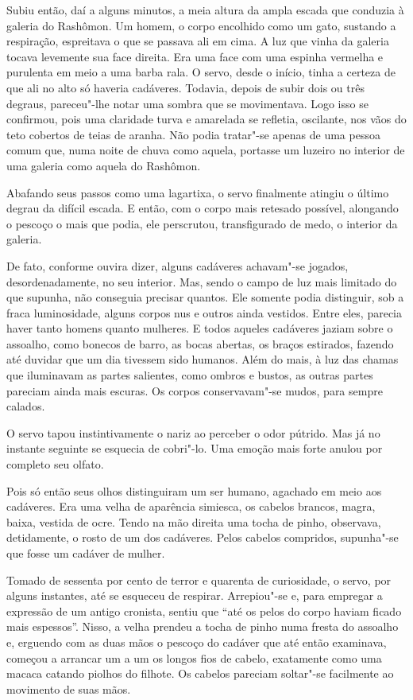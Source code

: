 Subiu então, daí a alguns minutos, a meia altura da ampla escada que
conduzia à galeria do Rashômon. Um homem, o corpo encolhido como um
gato, sustando a respiração, espreitava o que se passava ali em cima. A
luz que vinha da galeria tocava levemente sua face direita. Era uma
face com uma espinha vermelha e purulenta em meio a uma barba rala. O
servo, desde o início, tinha a certeza de que ali no alto só haveria
cadáveres. Todavia, depois de subir dois ou três degraus, pareceu"-lhe
notar uma sombra que se movimentava. Logo isso se confirmou, pois uma
claridade turva e amarelada se refletia, oscilante, nos vãos do teto
cobertos de teias de aranha. Não podia tratar"-se apenas de uma pessoa
comum que, numa noite de chuva como aquela, portasse um luzeiro no
interior de uma galeria como aquela do Rashômon.

Abafando seus passos como uma lagartixa, o servo finalmente atingiu o
último degrau da difícil escada. E então, com o corpo mais retesado
possível, alongando o pescoço o mais que podia, ele perscrutou, 
transfigurado de medo, o interior da galeria.

De fato, conforme ouvira dizer, alguns cadáveres achavam"-se jogados,
desordenadamente, no seu interior. Mas, sendo o campo de luz mais
limitado do que supunha, não conseguia precisar quantos. Ele somente
podia distinguir, sob a fraca luminosidade, alguns corpos nus e outros
ainda vestidos. Entre eles, parecia haver tanto homens quanto mulheres.
E todos aqueles cadáveres jaziam sobre o assoalho, como bonecos de
barro, as bocas abertas, os braços estirados, fazendo até duvidar que
um dia tivessem sido humanos. Além do mais, à luz das chamas que
iluminavam as partes salientes, como ombros e bustos, as outras partes
pareciam ainda mais escuras. Os corpos conservavam"-se mudos, para
sempre calados.

O servo tapou instintivamente o nariz ao perceber o odor pútrido. Mas já
no instante seguinte se esquecia de cobri"-lo. Uma emoção mais forte
anulou por completo seu olfato.

Pois só então seus olhos distinguiram um ser humano, agachado em meio
aos cadáveres. Era uma velha de aparência simiesca, os cabelos brancos,
magra, baixa, vestida de ocre. Tendo na mão direita uma tocha de pinho,
observava, detidamente, o rosto de um dos cadáveres. Pelos cabelos
compridos, supunha"-se que fosse um cadáver de mulher.

Tomado de sessenta por cento de terror e quarenta de curiosidade, o
servo, por alguns instantes, até se esqueceu de respirar. Arrepiou"-se
e, para empregar a expressão de um antigo cronista, sentiu que ``até os
pelos do corpo haviam ficado mais espessos''. Nisso, a velha prendeu a tocha de 
pinho numa fresta do assoalho e, erguendo com as duas mãos o pescoço do
cadáver que até então examinava, começou a arrancar um a um os longos
fios de cabelo, exatamente como uma macaca catando piolhos do filhote.
Os cabelos pareciam soltar"-se facilmente ao movimento de suas mãos.

